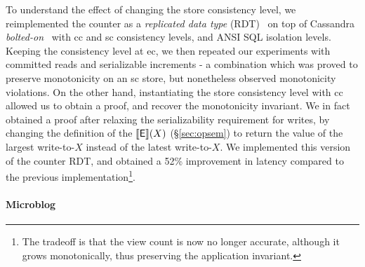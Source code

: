 To understand the effect of changing the store consistency level, we
reimplemented the counter as a \emph{replicated data type}
(RDT)~\cite{crdt,burckhardt14} on top of Cassandra
\emph{bolted-on}~\cite{bailisbolton} with {\sc cc} and {\sc sc}
consistency levels, and ANSI SQL isolation levels. Keeping the
consistency level at {\sc ec}, we then repeated our experiments with
committed reads and serializable increments - a combination which was
proved to preserve monotonicity on an {\sc sc} store, but nonetheless
observed monotonicity violations. On the other hand, instantiating the
store consistency level with {\sc cc} allowed us to obtain a proof,
and recover the monotonicity invariant. We in fact obtained a proof
after relaxing the serializability requirement for writes, by changing
the definition of the $\llbracket \textsf{E} \rrbracket(X)$ (\S\ref{sec:opsem}) to return
the value of the largest write-to-$X$ instead of the latest
write-to-$X$.  We implemented this version of the counter RDT, and
obtained a 52\% improvement in latency compared to the previous
implementation\footnote{The tradeoff is that the view count is now no
  longer accurate, although it grows monotonically, thus preserving
  the application invariant.}.

\paragraph{Microblog}

